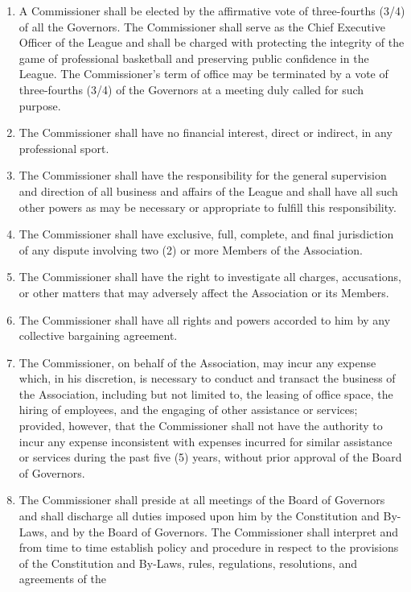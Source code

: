 \documentclass[]{book}
\theoremstyle{definition}
\theoremstyle{definition}
\theoremstyle{definition}
\theoremstyle{remark}
\begin{document}
\begin{enumerate}
\def\labelenumi{(\alph{enumi})}
\item
  A Commissioner shall be elected by the affirmative vote of
  three-fourths (3/4) of all the Governors. The Commissioner shall serve
  as the Chief Executive Officer of the League and shall be charged with
  protecting the integrity of the game of professional basketball and
  preserving public confidence in the League. The Commissioner's term of
  office may be terminated by a vote of three-fourths (3/4) of the
  Governors at a meeting duly called for such purpose.
\item
  The Commissioner shall have no financial interest, direct or indirect,
  in any professional sport.
\item
  The Commissioner shall have the responsibility for the general
  supervision and direction of all business and affairs of the League
  and shall have all such other powers as may be necessary or
  appropriate to fulfill this responsibility.
\item
  The Commissioner shall have exclusive, full, complete, and final
  jurisdiction of any dispute involving two (2) or more Members of the
  Association.
\item
  The Commissioner shall have the right to investigate all charges,
  accusations, or other matters that may adversely affect the
  Association or its Members.
\item
  The Commissioner shall have all rights and powers accorded to him by
  any collective bargaining agreement.
\item
  The Commissioner, on behalf of the Association, may incur any expense
  which, in his discretion, is necessary to conduct and transact the
  business of the Association, including but not limited to, the leasing
  of office space, the hiring of employees, and the engaging of other
  assistance or services; provided, however, that the Commissioner shall
  not have the authority to incur any expense inconsistent with expenses
  incurred for similar assistance or services during the past five (5)
  years, without prior approval of the Board of Governors.
\item
  The Commissioner shall preside at all meetings of the Board of
  Governors and shall discharge all duties imposed upon him by the
  Constitution and By-Laws, and by the Board of Governors. The
  Commissioner shall interpret and from time to time establish policy
  and procedure in respect to the provisions of the Constitution and
  By-Laws, rules, regulations, resolutions, and agreements of the

\end{enumerate}
\end{document}
